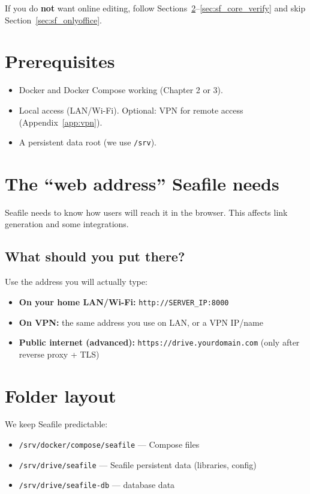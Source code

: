 If you do \textbf{not} want online editing, follow Sections~\ref{sec:sf_web_address}--\ref{sec:sf_core_verify} and skip Section~\ref{sec:sf_onlyoffice}.

\section{Prerequisites}
\begin{itemize}[leftmargin=*]
  \item Docker and Docker Compose working (Chapter 2 or 3).
  \item Local access (LAN/Wi-Fi). Optional: VPN for remote access (Appendix~\ref{app:vpn}).
  \item A persistent data root (we use \texttt{/srv}).
\end{itemize}

\section{The ``web address'' Seafile needs}
\label{sec:sf_web_address}
Seafile needs to know how users will reach it in the browser. This affects link generation and some integrations.

\subsection*{What should you put there?}
Use the address you will actually type:
\begin{itemize}[leftmargin=*]
  \item \textbf{On your home LAN/Wi-Fi:} \texttt{http://SERVER\_IP:8000}
  \item \textbf{On VPN:} the same address you use on LAN, or a VPN IP/name
  \item \textbf{Public internet (advanced):} \texttt{https://drive.yourdomain.com} (only after reverse proxy + TLS)
\end{itemize}


\section{Folder layout}
We keep Seafile predictable:

\begin{itemize}[leftmargin=*]
  \item \texttt{/srv/docker/compose/seafile} --- Compose files
  \item \texttt{/srv/drive/seafile} --- Seafile persistent data (libraries, config)
  \item \texttt{/srv/drive/seafile-db} --- database data
\end{itemize}

